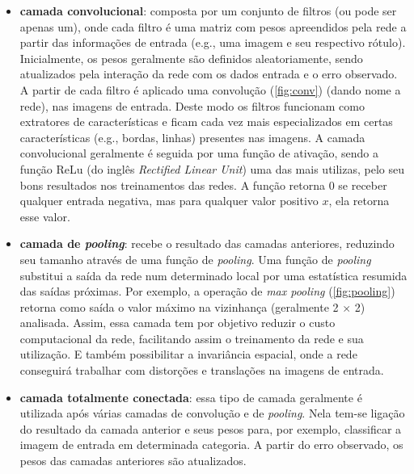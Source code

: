 \documentclass[12pt, a4paper, english, brazil]{article}
\begin{document}
\begin{itemize}

    \item \textbf{camada convolucional}: composta por um conjunto de filtros (ou pode ser apenas um), onde cada filtro é uma matriz com pesos apreendidos pela rede a partir das informações de entrada (e.g., uma imagem e seu respectivo rótulo). Inicialmente, os pesos geralmente são definidos aleatoriamente, sendo atualizados pela interação da rede com os dados entrada e o erro observado. A partir de cada filtro é aplicado uma convolução (\autoref{fig:conv}) (dando nome a rede), nas imagens de entrada. Deste modo os filtros funcionam como extratores de características e ficam cada vez mais especializados em certas características (e.g., bordas, linhas) presentes nas imagens. A camada convolucional geralmente é seguida por uma função de ativação, sendo a função ReLu (do inglês \textit{Rectified Linear Unit}) uma das mais utilizas, pelo seu bons resultados nos treinamentos das redes. A função retorna 0 se receber qualquer entrada negativa, mas para qualquer valor positivo $x$, ela retorna esse valor. 

    \item \textbf{camada de \textit{pooling}}: recebe o resultado das camadas anteriores, reduzindo seu tamanho através de uma função de \textit{pooling}. Uma função de \textit{pooling} substitui a saída da rede num determinado local por uma estatística resumida das saídas próximas. Por exemplo, a operação de \textit{max pooling} (\autoref{fig:pooling}) retorna como saída o valor máximo na vizinhança (geralmente 2 $\times$ 2) analisada. Assim, essa camada tem por objetivo reduzir o custo computacional da rede, facilitando assim o treinamento da rede e sua utilização. E também possibilitar a invariância espacial, onde a rede conseguirá trabalhar com distorções e translações na imagens de entrada.

    \item \textbf{camada totalmente conectada}: essa tipo de camada geralmente é utilizada após várias camadas de convolução e de \textit{pooling}. Nela tem-se ligação do resultado da camada anterior e seus pesos para, por exemplo, classificar a imagem de entrada em determinada categoria. A partir do erro observado, os pesos das camadas anteriores são atualizados.

\end{itemize}
\end{document}
